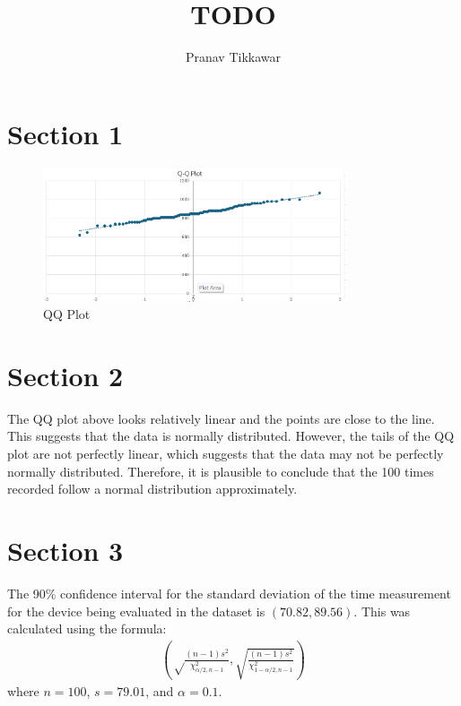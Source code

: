 \documentclass{article}
\author{Pranav Tikkawar}
\title{TODO}
\begin{document}
\maketitle

\section{Section 1}
\begin{figure}[ht]
    \centering
    \includegraphics[width=0.8\textwidth]{A4IMG/QQPlot.png}
    \caption{QQ Plot}
    \label{fig:qqplot}
\end{figure}

\section{Section 2}
The QQ plot above looks relatively linear and the points are close to the line. This suggests that the data is normally distributed. However, the tails of the QQ plot are not perfectly linear, which suggests that the data may not be perfectly normally distributed. Therefore, it is plausible to conclude that the 100 times recorded follow a normal distribution approximately.

\section{Section 3}
The 90\% confidence interval for the standard deviation of the time measurement for the device being evaluated in the dataset is $(70.82, 89.56)$. This was calculated using the formula:
\begin{align*}
    \left(\sqrt\frac{(n-1)s^2}{\chi^2_{\alpha/2, n-1}}, \sqrt{\frac{(n-1)s^2}{\chi^2_{1-\alpha/2, n-1}}}\right)
\end{align*}
where $n = 100$, $s = 79.01$, and $\alpha = 0.1$.
\end{document}
